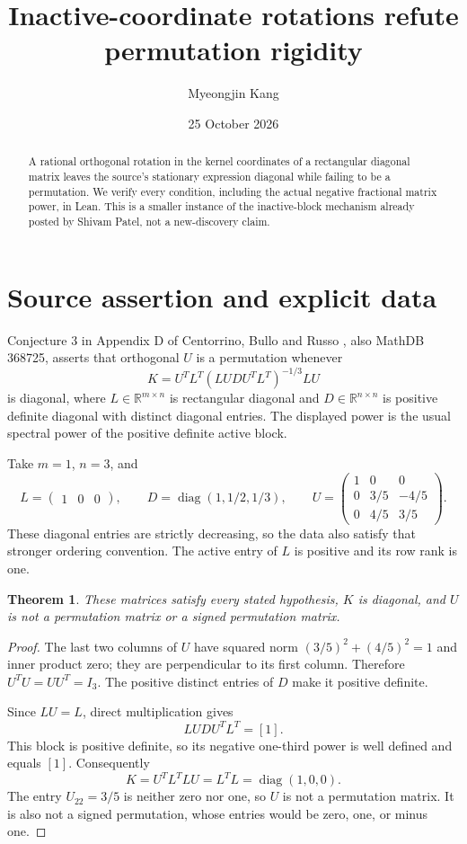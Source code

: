 \documentclass[11pt]{article}
\title{Inactive-coordinate rotations refute permutation rigidity}
\author{Myeongjin Kang}
\date{25 October 2026}
\newtheorem{theorem}{Theorem}
\begin{document}
\maketitle
\begin{abstract}
A rational orthogonal rotation in the kernel coordinates of a rectangular diagonal matrix leaves the source's stationary expression diagonal while failing to be a permutation. We verify every condition, including the actual negative fractional matrix power, in Lean. This is a smaller instance of the inactive-block mechanism already posted by Shivam Patel, not a new-discovery claim.
\end{abstract}
\section{Source assertion and explicit data}
Conjecture 3 in Appendix D of Centorrino, Bullo and Russo \cite{source}, also MathDB 368725, asserts that orthogonal $U$ is a permutation whenever
\[
K=U^T L^T(LUDU^TL^T)^{-1/3}LU
\]
is diagonal, where $L\in\mathbb R^{m\times n}$ is rectangular diagonal and $D\in\mathbb R^{n\times n}$ is positive definite diagonal with distinct diagonal entries. The displayed power is the usual spectral power of the positive definite active block.

Take $m=1$, $n=3$, and
\[
 L=\begin{pmatrix}1&0&0\end{pmatrix},\qquad
 D=\operatorname{diag}(1,1/2,1/3),\qquad
 U=\begin{pmatrix}1&0&0\\0&3/5&-4/5\\0&4/5&3/5\end{pmatrix}.
\]
These diagonal entries are strictly decreasing, so the data also satisfy that stronger ordering convention. The active entry of $L$ is positive and its row rank is one.
\begin{theorem}
These matrices satisfy every stated hypothesis, $K$ is diagonal, and $U$ is not a permutation matrix or a signed permutation matrix.
\end{theorem}
\begin{proof}
The last two columns of $U$ have squared norm $(3/5)^2+(4/5)^2=1$ and inner product zero; they are perpendicular to its first column. Therefore $U^TU=UU^T=I_3$. The positive distinct entries of $D$ make it positive definite.

Since $LU=L$, direct multiplication gives
\[
LUDU^TL^T=[1].
\]
This block is positive definite, so its negative one-third power is well defined and equals $[1]$. Consequently
\[
 K=U^TL^TLU=L^TL=\operatorname{diag}(1,0,0).
\]
The entry $U_{22}=3/5$ is neither zero nor one, so $U$ is not a permutation matrix. It is also not a signed permutation, whose entries would be zero, one, or minus one.
\end{proof}
\end{document}
